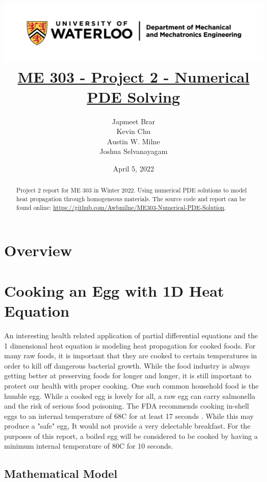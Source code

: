\documentclass[12pt]{article}
\title{
    \includegraphics[width=\linewidth]{resources/uwaterloo_mechanical_and_mechatronics_engineering/UWaterloo_Mechanical_Mechatronics_Eng_Logo_horiz_rgb.png}
    \\[1cm]
    \underline{\bf{ME 303 - Project 2 - Numerical PDE Solving}}
}
\author{
    Japmeet Brar \\
    Kevin Chu \\
    Austin W. Milne \\
    Joshua Selvanayagam
}
\date{April 5, 2022}
\begin{document}
\maketitle
\vfill
\begin{abstract}
    Project 2 report for ME 303 in Winter 2022. Using numerical PDE solutions to model heat propagation through homogeneous materials. The source code and report can be found online:
    \underline{\url{https://github.com/Awbmilne/ME303-Numerical-PDE-Solution}}.
\end{abstract}

\clearpage
{}

\tableofcontents

\clearpage
\listoftables
\listoffigures
\lstlistoflistings

\clearpage
{}
\section{Overview}


\section{ Cooking an Egg with 1D Heat Equation}

An interesting health related application of partial differential equations and the 1 dimensional heat equation is modeling heat propagation for cooked foods. For many raw foods, it is important that they are cooked to certain temperatures in order to kill off dangerous bacterial growth. While the food industry is always getting better at preserving foods for longer and longer, it is still important to protect our health with proper cooking. One such common household food is the humble egg. While a cooked egg is lovely for all, a raw egg can carry salmonella and the risk of serious food poisoning. The FDA recommends cooking in-shell eggs to an internal temperature of 68\textdegree C for at least 17 seconds \cite{fda_egg_cook}. While this may produce a "safe" egg, It would not provide a very delectable breakfast. For the purposes of this report, a boiled egg will be considered to be cooked by having a minimum internal temperature of 80\textdegree C for 10 seconds.  

\subsection{Mathematical Model}
\end{document}
